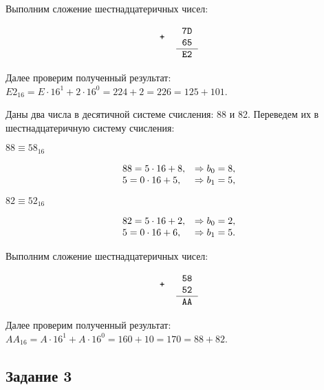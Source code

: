 \documentclass[a4paper,14pt]{extarticle}
\begin{document}
  Выполним сложение шестнадцатеричных чисел:

  \[
  \begin{tabular}{{c}{c}}
    \texttt{+} &
    \begin{tabular}{c}
      \texttt{7D}\\
      \texttt{65}\\
      \hline
    \end{tabular}\\
    & \texttt{E2}
  \end{tabular}
  \]

  Далее проверим полученный результат:\\
  $E2_{16}=E \cdot 16^{1} + 2 \cdot 16^{0}=224+2=226=125+101$.

  Даны два числа в десятичной системе счисления: 88 и 82. Переведем их в шестнадцатеричную систему счисления:

  $88 \equiv 58_{16}$

  \[
  \begin{array}[c]{ll}
    88 = 5 \cdot 16 + 8, &\Rightarrow b_{0} = 8,\\
    5 = 0 \cdot 16 + 5, &\Rightarrow b_{1} = 5,\\
  \end{array}
  \]

  $82 \equiv 52_{16}$

  \[
  \begin{array}[c]{ll}
    82 = 5 \cdot 16 + 2, &\Rightarrow b_{0} = 2,\\
    5 = 0 \cdot 16 + 6, &\Rightarrow b_{1} = 5.\\
  \end{array}
  \]

  Выполним сложение шестнадцатеричных чисел:

  \[
  \begin{tabular}{{c}{c}}
    \texttt{+} &
    \begin{tabular}{c}
      \texttt{58}\\
      \texttt{52}\\
      \hline
    \end{tabular}\\
    & \texttt{AA}
  \end{tabular}
  \]

  Далее проверим полученный результат:\\
  $AA_{16}=A \cdot 16^{1} + A \cdot 16^{0}=160+10=170=88+82$.

  \pagebreak

  \subsection*{Задание 3}
\end{document}

